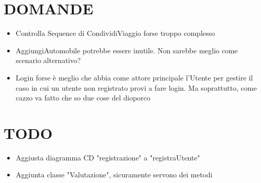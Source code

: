 \documentclass{article}
\newcommand\blankpage{
    \null
    \thispagestyle{empty}
    \addtocounter{page}{-1}
    \newpage}
\begin{document}


\blankpage

\thispagestyle{empty}
\tableofcontents

\blankpage

\clearpage





\section {DOMANDE}

\begin{itemize}
    \item Controlla Sequence di CondividiViaggio forse troppo complesso
    \item AggiungiAutomobile potrebbe essere inutile. Non sarebbe meglio come scenario alternativo?
    \item Login forse è meglio che abbia come attore principale l'Utente per gestire il caso in cui un utente non registrato provi a fare login. Ma soprattutto, come cazzo va fatto che so due cose del dioporco
\end{itemize}

\section {TODO}

\begin{itemize}
    \item {Aggiusta diagramma CD "registrazione" a "registraUtente"}
    \item {Aggiunta classe "Valutazione", sicuramente servono dei metodi }
\end{itemize}
\end{document}
